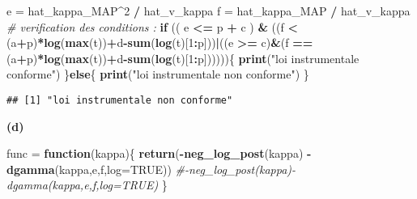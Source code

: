 \documentclass[
]{article}
\newenvironment{Shaded}{\begin{snugshade}}{\end{snugshade}}
\newcommand{\CommentTok}[1]{\textcolor[rgb]{0.56,0.35,0.01}{\textit{#1}}}
\newcommand{\ControlFlowTok}[1]{\textcolor[rgb]{0.13,0.29,0.53}{\textbf{#1}}}
\newcommand{\DataTypeTok}[1]{\textcolor[rgb]{0.13,0.29,0.53}{#1}}
\newcommand{\DecValTok}[1]{\textcolor[rgb]{0.00,0.00,0.81}{#1}}
\newcommand{\FloatTok}[1]{\textcolor[rgb]{0.00,0.00,0.81}{#1}}
\newcommand{\KeywordTok}[1]{\textcolor[rgb]{0.13,0.29,0.53}{\textbf{#1}}}
\newcommand{\NormalTok}[1]{#1}
\newcommand{\OperatorTok}[1]{\textcolor[rgb]{0.81,0.36,0.00}{\textbf{#1}}}
\newcommand{\OtherTok}[1]{\textcolor[rgb]{0.56,0.35,0.01}{#1}}
\newcommand{\StringTok}[1]{\textcolor[rgb]{0.31,0.60,0.02}{#1}}
\begin{document}
\begin{Shaded}
\begin{Highlighting}[]
\NormalTok{e =}\StringTok{ }\NormalTok{hat_kappa_MAP}\OperatorTok{^}\DecValTok{2} \OperatorTok{/}\StringTok{ }\NormalTok{hat_v_kappa}
\NormalTok{f =}\StringTok{ }\NormalTok{hat_kappa_MAP }\OperatorTok{/}\StringTok{ }\NormalTok{hat_v_kappa}
\CommentTok{# verification des conditions :}
\ControlFlowTok{if}\NormalTok{ (( e }\OperatorTok{<=}\StringTok{ }\NormalTok{p }\OperatorTok{+}\StringTok{ }\NormalTok{c ) }\OperatorTok{&}\StringTok{ }\NormalTok{((f }\OperatorTok{<}\StringTok{ }\NormalTok{(a}\OperatorTok{+}\NormalTok{p)}\OperatorTok{*}\KeywordTok{log}\NormalTok{(}\KeywordTok{max}\NormalTok{(t))}\OperatorTok{+}\NormalTok{d}\OperatorTok{-}\KeywordTok{sum}\NormalTok{(}\KeywordTok{log}\NormalTok{(t)[}\DecValTok{1}\OperatorTok{:}\NormalTok{p]))}\OperatorTok{|}\NormalTok{((e }\OperatorTok{>=}\StringTok{ }\NormalTok{c)}\OperatorTok{&}\NormalTok{(f }\OperatorTok{==}\StringTok{ }\NormalTok{(a}\OperatorTok{+}\NormalTok{p)}\OperatorTok{*}\KeywordTok{log}\NormalTok{(}\KeywordTok{max}\NormalTok{(t))}\OperatorTok{+}\NormalTok{d}\OperatorTok{-}\KeywordTok{sum}\NormalTok{(}\KeywordTok{log}\NormalTok{(t)[}\DecValTok{1}\OperatorTok{:}\NormalTok{p])))))\{}
 \KeywordTok{print}\NormalTok{(}\StringTok{"loi instrumentale conforme"}\NormalTok{)}
\NormalTok{\}}\ControlFlowTok{else}\NormalTok{\{}
 \KeywordTok{print}\NormalTok{(}\StringTok{"loi instrumentale non conforme"}\NormalTok{)}
\NormalTok{\}}
\end{Highlighting}
\end{Shaded}

\begin{verbatim}
## [1] "loi instrumentale non conforme"
\end{verbatim}

\textbf{(d)}

\begin{Shaded}
\begin{Highlighting}[]
\NormalTok{func =}\StringTok{ }\ControlFlowTok{function}\NormalTok{(kappa)\{}
\KeywordTok{return}\NormalTok{(}\OperatorTok{-}\KeywordTok{neg_log_post}\NormalTok{(kappa) }\OperatorTok{-}\StringTok{ }\KeywordTok{dgamma}\NormalTok{(kappa,e,f,}\DataTypeTok{log=}\OtherTok{TRUE}\NormalTok{))}
\CommentTok{#-neg_log_post(kappa)-dgamma(kappa,e,f,log=TRUE)}
\NormalTok{\} }
\end{Highlighting}
\end{Shaded}

\begin{Shaded}
\end{Shaded}
\end{document}
